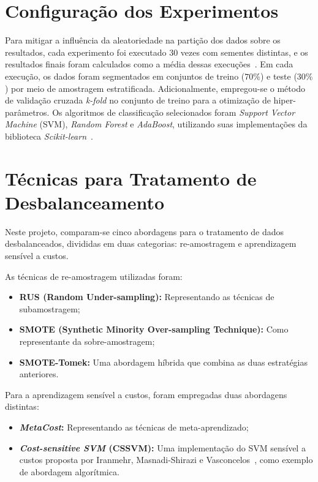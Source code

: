 \section{Configuração dos Experimentos}\label{sec:configuracao-experimentos}

Para mitigar a influência da aleatoriedade na partição dos dados sobre os resultados, cada experimento foi executado \(30\) vezes com sementes distintas, e os resultados finais foram calculados como a média dessas execuções~\cite{Namvar2018}. Em cada execução, os dados foram segmentados em conjuntos de treino (\(70\%\)) e teste (\(30\%\)) por meio de amostragem estratificada. Adicionalmente, empregou-se o método de validação cruzada \textit{k-fold} no conjunto de treino para a otimização de hiper-parâmetros. Os algoritmos de classificação selecionados foram \textit{Support Vector Machine} (SVM), \textit{Random Forest} e \textit{AdaBoost}, utilizando suas implementações da biblioteca \textit{Scikit-learn}~\cite{Pedregosa2011scikit}.

\section{Técnicas para Tratamento de Desbalanceamento}\label{sec:tecnicas}

Neste projeto, comparam-se cinco abordagens para o tratamento de dados desbalanceados, divididas em duas categorias: re-amostragem e aprendizagem sensível a custos.

As técnicas de re-amostragem utilizadas foram:
\begin{itemize}
  \item \textbf{RUS (Random Under-sampling):} Representando as técnicas de subamostragem;
  \item \textbf{SMOTE (Synthetic Minority Over-sampling Technique):} Como representante da sobre-amostragem;
  \item \textbf{SMOTE-Tomek:} Uma abordagem híbrida que combina as duas estratégias anteriores.
\end{itemize}
Para a aprendizagem sensível a custos, foram empregadas duas abordagens distintas:
\begin{itemize}
  \item \textbf{\textit{MetaCost}:} Representando as técnicas de meta-aprendizado;
  \item \textbf{\textit{Cost-sensitive SVM} (CSSVM):} Uma implementação do SVM sensível a custos proposta por Iranmehr, Masnadi-Shirazi e Vasconcelos~\cite{Iranmehr2019}, como exemplo de abordagem algorítmica.
\end{itemize}

